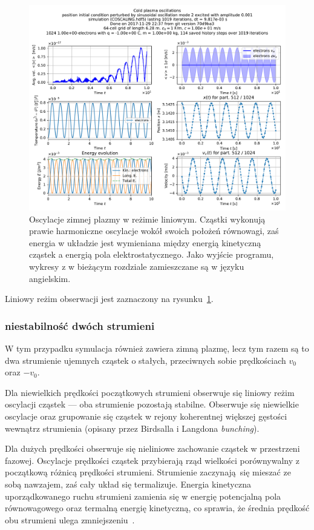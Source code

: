 \begin{figure}[h!]
  \includegraphics[width=\textwidth]{Images/COSCALING}
  \caption{Oscylacje zimnej plazmy w reżimie liniowym. Cząstki wykonują prawie harmoniczne oscylacje wokół swoich położeń równowagi, zaś energia
   w układzie jest wymieniana między energią kinetyczną cząstek a energią pola
elektrostatycznego. Jako wyjście programu, wykresy z \pythonpic{} w bieżącym rozdziale zamieszczane są w języku angielskim.\label{fig:coldplasma-linear}}

\end{figure}

Liniowy reżim obserwacji jest zaznaczony na rysunku~\ref{fig:coldplasma-linear}.%

    \subsubsection{niestabilność dwóch strumieni}
W tym przypadku symulacja również zawiera zimną plazmę, lecz tym razem są to dwa strumienie ujemnych cząstek
o stałych, przeciwnych sobie prędkościach $v_0$ oraz $-v_0$.

    Dla niewielkich prędkości początkowych strumieni obserwuje się
    liniowy reżim oscylacji cząstek --- oba strumienie pozostają stabilne. Obserwuje się niewielkie oscylacje oraz
grupowanie się cząstek w rejony koherentnej większej gęstości wewnątrz strumienia (opisany przez Birdsalla i Langdona \emph{bunching}).

    Dla dużych prędkości obserwuje się nieliniowe
    zachowanie cząstek w przestrzeni fazowej. Oscylacje prędkości cząstek przybierają rząd wielkości porównywalny
    z początkową różnicą prędkości strumieni.
 Strumienie zaczynają się mieszać ze sobą nawzajem, zaś cały układ się termalizuje. Energia kinetyczna
 uporządkowanego ruchu strumieni zamienia się w energię potencjalną pola równowagowego 
oraz termalną energię kinetyczną, co sprawia, że średnia prędkość obu strumieni ulega zmniejszeniu~\cite{birdsall}.

